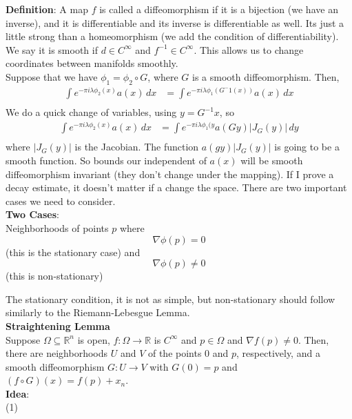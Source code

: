 \documentclass[12pt]{article}
\begin{document}
\noindent \textbf{Definition}: A map $f$ is called a diffeomorphism if it is a bijection (we have an inverse), and it is differentiable and its inverse is differentiable as well. Its just a little strong than a homeomorphism (we add the condition of differentiability). We say it is smooth if $d \in C^{\infty}$ and $f^{-1} \in C^{\infty}$. This allows us to change coordinates between manifolds smoothly. \\

\noindent Suppose that we have $\phi_1 = \phi_2 \circ G$, where $G$ is a smooth diffeomorphism. Then, 
\begin{align*}
\int e^{-\pi i \lambda \phi_2(x)}a(x) \,dx &= \int e^{-\pi i \lambda \phi_1(G^-1(x))} a(x) \,dx \\
\end{align*}
We do a quick change of variables, using $y=G^{-1}x$, so
\begin{align*}
\int e^{-\pi i \lambda \phi_2(x)}a(x) \,dx &= \int e^{-\pi i \lambda \phi_1(y} a(Gy) \vert J_G(y) \vert \,dy \\
\end{align*}
where $\vert J_G(y) \vert$ is the Jacobian. The function $a(gy) \vert J_G(y) \vert$ is going to be a smooth function. So bounds our independent of $a(x)$ will be smooth diffeomorphism invariant (they don't change under the mapping). If I prove a decay estimate, it doesn't matter if a change the space. There are two important cases we need to consider. \\

\noindent \textbf{Two Cases}: \\
\noindent Neighborhoods of points $p$ where 
$$\nabla \phi(p) = 0$$
(this is the stationary case) and
$$\nabla \phi(p) \not = 0$$
(this is non-stationary)

\noindent The stationary condition, it is not as simple, but non-stationary should follow similarly to the Riemann-Lebesgue Lemma. \\

\noindent \textbf{Straightening Lemma} \\
\noindent Suppose $\Omega \subseteq \mathbb{R}^n$ is open, $f : \Omega \rightarrow \mathbb{R}$ is $C^{\infty}$ and $p \in \Omega$ and $\nabla f (p) \not = 0$. Then, there are neighborhoods $U$ and $V$ of the points $0$ and $p$, respectively, and a smooth diffeomorphism $G:U \rightarrow V$ with $G(0)=p$ and $(f \circ G)(x) = f(p) + x_n$. \\

\noindent \textbf{Idea}: \\
(1)
\end{document}
